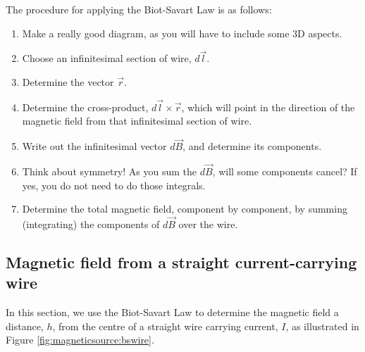 The procedure for applying the Biot-Savart Law is as follows:
\begin{enumerate}
\item Make a really good diagram, as you will have to include some 3D aspects.
\item Choose an infinitesimal section of wire, $d\vec l$.
\item Determine the vector $\vec r$.
\item Determine the cross-product, $d\vec l \times \vec r$, which will point in the direction of the magnetic field from that infinitesimal section of wire.
\item Write out the infinitesimal vector $d\vec B$, and determine its components.
\item Think about symmetry! As you sum the $d\vec B$, will some components cancel? If yes, you do not need to do those integrals.
\item Determine the total magnetic field, component by component, by summing (integrating) the components of $d\vec B$ over the wire.
\end{enumerate}

\subsection{Magnetic field from a straight current-carrying wire}
In this section, we use the Biot-Savart Law to determine the magnetic field a distance, $h$, from the centre of a straight wire carrying current, $I$, as illustrated in Figure \ref{fig:magneticsource:bswire}.

